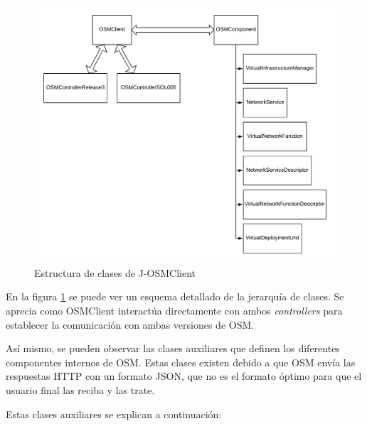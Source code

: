 \clearpage

\begin{figure}[!ht]
	\centering
	\includegraphics[width=1\linewidth]{imagenes/OSMClient}
	\caption{Estructura de clases de J-OSMClient}
	\label{fig:osmclient}
\end{figure}

En la figura \ref{fig:osmclient} se puede ver un esquema detallado de la jerarquía de clases. Se aprecia como OSMClient interactúa directamente con ambos \textit{controllers} para establecer la comunicación con ambas versiones de \ac{OSM}.

Así mismo, se pueden observar las clases auxiliares que definen los diferentes componentes internos de \ac{OSM}. Estas clases existen debido a que \ac{OSM} envía las respuestas \ac{HTTP} con un formato \ac{JSON}, que no es el formato óptimo para que el usuario final las reciba y las trate.

Estas clases auxiliares se explican a continuación:

